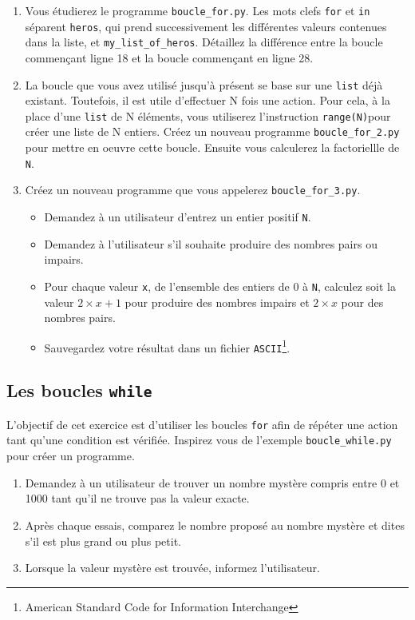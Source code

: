 \begin{enumerate}
\item Vous étudierez le programme \texttt{boucle\_for.py}.
  Les mots clefs \texttt{for} et \texttt{in} séparent \texttt{heros}, qui prend successivement
  les différentes valeurs contenues dans la liste, et \texttt{my\_list\_of\_heros}.
  Détaillez la différence entre la boucle commençant ligne 18 et la boucle commençant en ligne 28.

\item La boucle que vous avez utilisé jusqu'à présent se base sur une \texttt{list} déjà existant.
  Toutefois, il est utile d'effectuer N fois une action. Pour cela, à la place d'une \texttt{list} de N
  éléments, vous utiliserez l'instruction \texttt{range(N)}pour créer une liste de N entiers.
  Créez un nouveau programme \texttt{boucle\_for\_2.py} pour mettre en oeuvre cette boucle.
  Ensuite vous calculerez la factoriellle de \texttt{N}.

\item Créez un nouveau programme que vous appelerez \texttt{boucle\_for\_3.py}.
  \begin{itemize}
  \item Demandez à un utilisateur d'entrez un entier positif \texttt{N}.
  \item Demandez à l'utilisateur s'il souhaite produire des nombres pairs ou impairs.
  \item Pour chaque valeur \texttt{x}, de l'ensemble des entiers de 0 à \texttt{N},
    calculez soit la valeur $2\times x+1$ pour produire des nombres impairs et $2\times x$ pour des nombres pairs.
  \item Sauvegardez votre résultat dans un fichier \texttt{ASCII}\footnote{American Standard Code for Information Interchange}.
  \end{itemize}

\end{enumerate}




\subsection{Les boucles \texttt{while}}

L'objectif de cet exercice est d'utiliser les boucles \texttt{for} afin de répéter une action
tant qu'une condition est vérifiée.
Inspirez vous de l'exemple \texttt{boucle\_while.py} pour créer un programme.

\begin{enumerate}
\item Demandez à un utilisateur de trouver un nombre mystère compris entre 0 et 1000 tant qu'il ne trouve pas
  la valeur exacte.

\item Après chaque essais, comparez le nombre proposé au nombre mystère et dites s'il est plus grand ou plus petit.

\item Lorsque la valeur mystère est trouvée, informez l'utilisateur.

\end{enumerate}
\vfill
